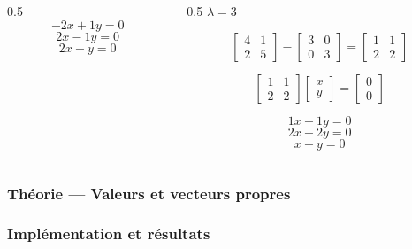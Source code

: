 \begin{frame}
\begin{columns}
\begin{column}{0.5\textwidth}
            \begin{equation}
                -2x+1y=0
            \end{equation}
            \begin{equation}
                2x-1y=0
            \end{equation}
            \begin{equation}
                2x-y=0
            \end{equation}
		\end{column}
		\begin{column}{0.5\textwidth}
			\centering
			$\lambda=3$

            \begin{equation}
               \begin{bmatrix}
                    4&1\\
                    2&5
                \end{bmatrix}
                -
                \begin{bmatrix}
                    3&0\\
                    0&3
                \end{bmatrix}
                =
                \begin{bmatrix}
                    1&1\\
                    2&2
                \end{bmatrix}
            \end{equation}

            \begin{equation}
                \begin{bmatrix}
                    1&1\\
                    2&2
                \end{bmatrix}
                \begin{bmatrix}
                    x\\y
                \end{bmatrix}
                =
                \begin{bmatrix}
                    0\\0
                \end{bmatrix}
            \end{equation}

            \begin{equation}
                1x+1y=0
            \end{equation}
            \begin{equation}
                2x+2y=0
            \end{equation}
            \begin{equation}
                x-y=0
            \end{equation}
		\end{column}
	\end{columns}    
\end{frame}

\begin{frame}
\frametitle{Théorie — Valeurs et vecteurs propres}
\todo{}
\end{frame}

\begin{frame}
\frametitle{Implémentation et résultats}
\todo{}
\end{frame}

